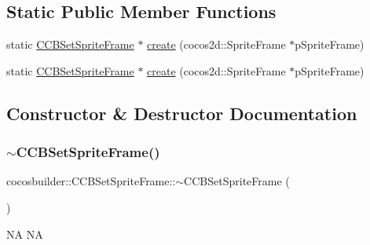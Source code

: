 \subsection*{Static Public Member Functions}
\begin{DoxyCompactItemize}
\item 
static \hyperlink{classcocosbuilder_1_1CCBSetSpriteFrame}{C\+C\+B\+Set\+Sprite\+Frame} $\ast$ \hyperlink{classcocosbuilder_1_1CCBSetSpriteFrame_a0d788e548c11993675b553040dbdbf4e}{create} (cocos2d\+::\+Sprite\+Frame $\ast$p\+Sprite\+Frame)
\item 
static \hyperlink{classcocosbuilder_1_1CCBSetSpriteFrame}{C\+C\+B\+Set\+Sprite\+Frame} $\ast$ \hyperlink{classcocosbuilder_1_1CCBSetSpriteFrame_a0d788e548c11993675b553040dbdbf4e}{create} (cocos2d\+::\+Sprite\+Frame $\ast$p\+Sprite\+Frame)
\end{DoxyCompactItemize}


\subsection{Constructor \& Destructor Documentation}
\mbox{\label{classcocosbuilder_1_1CCBSetSpriteFrame_adefee94b6e6667d708b9309e17166e26}} 
\subsubsection{\texorpdfstring{$\sim$\+C\+C\+B\+Set\+Sprite\+Frame()}{~CCBSetSpriteFrame()}\hspace{0.1cm}{\footnotesize\ttfamily [1/2]}}
{\footnotesize\ttfamily cocosbuilder\+::\+C\+C\+B\+Set\+Sprite\+Frame\+::$\sim$\+C\+C\+B\+Set\+Sprite\+Frame (\begin{DoxyParamCaption}{ }\end{DoxyParamCaption})}

NA  NA \mbox{\label{classcocosbuilder_1_1CCBSetSpriteFrame_adefee94b6e6667d708b9309e17166e26}} 
